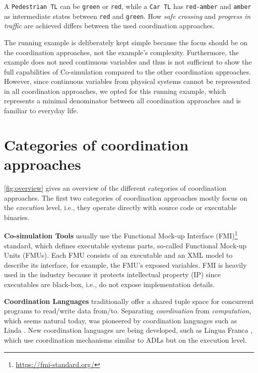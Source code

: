 \documentclass[runningheads]{llncs}
\begin{document}
A \texttt{Pedestrian TL} can be \texttt{green} or \texttt{red}, while a \texttt{Car TL} has \texttt{red-amber} and \texttt{amber} as intermediate states between \texttt{red} and \texttt{green}.
How \textit{safe crossing} and \textit{progress in traffic} are achieved differs between the used coordination approaches.

The running example is deliberately kept simple because the focus should be on the coordination approaches, not the example's complexity.
Furthermore, the example does not need continuous variables and thus is not sufficient to show the full capabilities of Co-simulation compared to the other coordination approaches.
However, since continuous variables from physical systems cannot be represented in all coordination approaches, we opted for this running example, which represents a minimal denominator between all coordination approaches and is familiar to everyday life.

\section{Categories of coordination approaches} \label{sec:approaches}

\autoref{fig:overview} gives an overview of the different categories of coordination approaches.
The first two categories of coordination approaches mostly focus on the \textit{execution} level, i.e., they operate directly with source code or executable binaries.

\textbf{Co-simulation Tools} usually use the Functional Mock-up Interface (FMI)\footnote{\url{https://fmi-standard.org/}} standard, which defines executable systems parts, so-called Functional Mock-up Units (FMUs).
Each FMU consists of an executable and an XML model to describe its interface, for example, the FMU's exposed variables.
FMI is heavily used in the industry because it protects intellectual property (IP) since executables are black-box, i.e., do not expose implementation details.

\textbf{Coordination Languages} traditionally offer a shared tuple space for concurrent programs to read/write data from/to.
Separating \textit{coordination} from \textit{computation}, which seems natural today, was pioneered by coordination languages such as Linda \cite{carrieroLindaContext1989}.
New coordination languages are being developed, such as Lingua Franca \cite{lohstrohReactorsDeterministicModel2020}, which use coordination mechanisms similar to ADLs but on the execution level.
\end{document}
